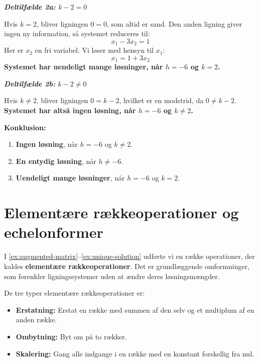 \begin{example}
\begin{solution}
        \textbf{\textit{Deltilfælde 2a:} $k - 2 = 0$}
        
          Hvis $k = 2$, bliver ligningen $0 = 0$, som altid er sand. Den anden ligning giver ingen ny information, så systemet reduceres til:
          \[
          x_1 - 3x_2 = 1
          \]
          Her er $x_2$ en fri variabel. Vi løser med hensyn til $x_1$:
          \[
          x_1 = 1 + 3x_2
          \]
          \textbf{Systemet har uendeligt mange løsninger, når $h = -6$ og $k = 2$.}
        
        \textbf{\textit{Deltilfælde 2b:} $k - 2 \ne 0$}
        
          Hvis $k \ne 2$, bliver ligningen $0 = k - 2$, hvilket er en modstrid, da $0 \ne k - 2$. \textbf{Systemet har altså ingen løsning, når $h = -6$ og $k \ne 2$.}
                
        \textbf{Konklusion:}
        
        \begin{enumerate}[label=(\roman*)]
            \item \textbf{Ingen løsning}, når $h = -6$ og $k \ne 2$.
            \item \textbf{En entydig løsning}, når $h \ne -6$.
            \item \textbf{Uendeligt mange løsninger}, når $h = -6$ og $k = 2$.
        \end{enumerate} \end{solution}


\end{example}
\section{Elementære rækkeoperationer og echelonformer}

I \autoref{ex:augmented-matrix}--\autoref{ex:unique-solution} udførte vi en række operationer, der kaldes \textbf{elementære rækkeoperationer}. Det er grundlæggende omformninger, som forenkler ligningssystemer uden at ændre deres løsningsmængder.

De tre typer elementære rækkeoperationer er:
\begin{itemize}
    \item \textbf{Erstatning:} Erstat en række med summen af den selv og et multiplum af en anden række.
    \item \textbf{Ombytning:} Byt om på to rækker.
    \item \textbf{Skalering:} Gang alle indgange i en række med en konstant forskellig fra nul.
\end{itemize}

